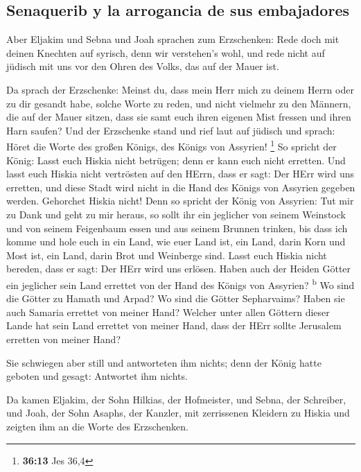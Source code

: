 \hypertarget{senaquerib-y-la-arrogancia-de-sus-embajadores}{%
\subsection{Senaquerib y la arrogancia de sus
embajadores}\label{senaquerib-y-la-arrogancia-de-sus-embajadores}}

 Aber Eljakim und Sebna und Joah sprachen zum
Erzschenken: Rede doch mit deinen Knechten auf syrisch, denn wir
verstehen's wohl, und rede nicht auf jüdisch mit uns vor den Ohren des
Volks, das auf der Mauer ist.

 Da sprach der Erzschenke: Meinst du, dass mein Herr mich
zu deinem Herrn oder zu dir gesandt habe, solche Worte zu reden, und
nicht vielmehr zu den Männern, die auf der Mauer sitzen, dass sie samt
euch ihren eigenen Mist fressen und ihren Harn saufen? 
Und der Erzschenke stand und rief laut auf jüdisch und sprach: Höret die
Worte des großen Königs, des Königs von Assyrien! \footnote{\textbf{36:13}
  Jes 36,4}  So spricht der König: Lasst euch Hiskia
nicht betrügen; denn er kann euch nicht erretten.  Und
lasst euch Hiskia nicht vertrösten auf den HErrn, dass er sagt: Der HErr
wird uns erretten, und diese Stadt wird nicht in die Hand des Königs von
Assyrien gegeben werden.  Gehorchet Hiskia nicht! Denn so
spricht der König von Assyrien: Tut mir zu Dank und geht zu mir heraus,
so sollt ihr ein jeglicher von seinem Weinstock und von seinem
Feigenbaum essen und aus seinem Brunnen trinken,  bis
dass ich komme und hole euch in ein Land, wie euer Land ist, ein Land,
darin Korn und Most ist, ein Land, darin Brot und Weinberge sind.
 Lasst euch Hiskia nicht bereden, dass er sagt: Der HErr
wird uns erlösen. Haben auch der Heiden Götter ein jeglicher sein Land
errettet von der Hand des Königs von Assyrien? \textsuperscript{b}
 Wo sind die Götter zu Hamath und Arpad? Wo sind die
Götter Sepharvaims? Haben sie auch Samaria errettet von meiner Hand?
 Welcher unter allen Göttern dieser Lande hat sein Land
errettet von meiner Hand, dass der HErr sollte Jerusalem erretten von
meiner Hand?

 Sie schwiegen aber still und antworteten ihm nichts;
denn der König hatte geboten und gesagt: Antwortet ihm nichts.

 Da kamen Eljakim, der Sohn Hilkias, der Hofmeister, und
Sebna, der Schreiber, und Joah, der Sohn Asaphs, der Kanzler, mit
zerrissenen Kleidern zu Hiskia und zeigten ihm an die Worte des
Erzschenken.

